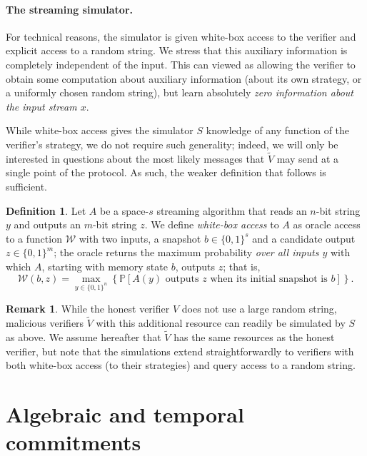 \documentclass[10pt,a4paper]{article}
\newif\iflipics\lipicsfalse
\theoremstyle{definition}
\newtheorem{remark}[theorem]{Remark}
\newtheorem{definition}[theorem]{Definition}
\renewcommand{\P}{\mathbb P}
\renewcommand{\set}[1]{\left\{#1\right\}}
\newcommand{\bitset}{\{0,1\}}
\newcommand{\snapshot}{b}
\newcommand{\whiteboxoracle}{\mathcal{W}}
\begin{document}
\paragraph*{The streaming simulator\iflipics\else.\fi}
For technical reasons, the simulator is given white-box access to the verifier and explicit access to a random string. We stress that this auxiliary information is completely independent of the input. This can viewed as allowing the verifier to obtain some computation about auxiliary information (about its own strategy, or a uniformly chosen random string), but learn absolutely \emph{zero information about the input stream $x$}. 

While white-box access gives the simulator $S$ knowledge of any function of the verifier's strategy, we do not require such generality; indeed, we will only be interested in questions about the most likely messages that $\widetilde V$ may send at a single point of the protocol. As such, the weaker definition that follows is sufficient.

\begin{definition}
    \label{def:whitebox-max}
    Let $A$ be a space-$s$ streaming algorithm that reads an $n$-bit string $y$ and outputs an $m$-bit string $z$. We define \emph{white-box access} to $A$ as oracle access to a function $\whiteboxoracle$ with two inputs, a snapshot $\snapshot \in \bitset^s$ and a candidate output $z \in \bitset^m$; the oracle returns the maximum probability \emph{over all inputs $y$} with which $A$, starting with memory state $\snapshot$, outputs $z$; that is,
    \begin{equation*}
        \whiteboxoracle(\snapshot,z) = \max_{y \in \bitset^n}\set{\P[A(y) \text{ outputs } z \text{ when its initial snapshot is } \snapshot]}.
    \end{equation*}
\end{definition}

\begin{remark}
    \label{rem:streaming-vs-memory-bottleneck}
    While the honest verifier $V$ does not use a large random string, malicious verifiers $\widetilde V$ with this additional resource can readily be simulated by $S$ as above. We assume hereafter that $\widetilde V$ has the same resources as the honest verifier, but note that the simulations extend straightforwardly to verifiers with both white-box access (to their strategies) and query access to a random string.    
\end{remark}

\section{Algebraic and temporal commitments}
\label{sec:commitment-protocols}
\end{document}
